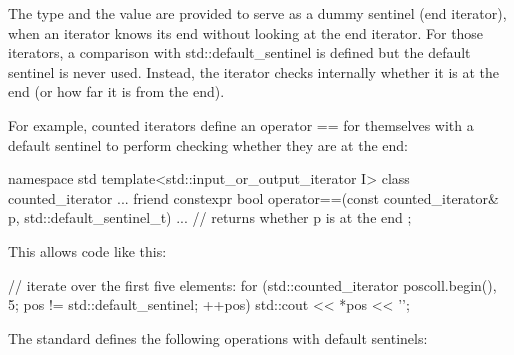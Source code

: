 The type and the value are provided to serve as a dummy sentinel (end iterator), when an iterator knows its end without looking at the end iterator. For those iterators, a comparison with std::default\_sentinel is defined but the default sentinel is never used. Instead, the iterator checks internally whether it is at the end (or how far it is from the end).

For example, counted iterators define an operator == for themselves with a default sentinel to perform checking whether they are at the end:

\begin{cpp}
namespace std {
	template<std::input_or_output_iterator I>
	class counted_iterator {
		...
		friend constexpr bool operator==(const counted_iterator& p,
		std::default_sentinel_t) {
			... // returns whether p is at the end
		}
	};
}
\end{cpp}

This allows code like this:

\begin{cpp}
// iterate over the first five elements:
for (std::counted_iterator pos{coll.begin(), 5};
pos != std::default_sentinel;
++pos) {
	std::cout << *pos << '\n';
}
\end{cpp}

The standard defines the following operations with default sentinels:

